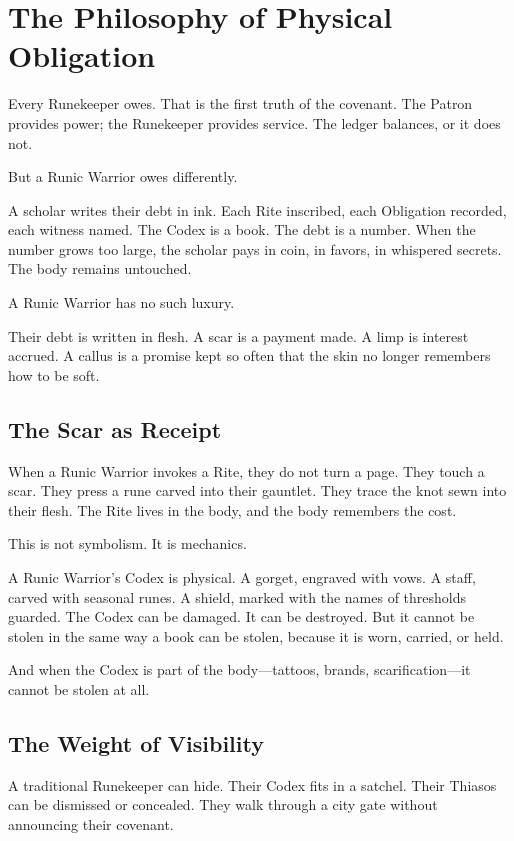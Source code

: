 \section{The Philosophy of Physical Obligation}

Every Runekeeper owes. That is the first truth of the covenant. The Patron provides power; the Runekeeper provides service. The ledger balances, or it does not.

But a Runic Warrior owes differently.

A scholar writes their debt in ink. Each Rite inscribed, each Obligation recorded, each witness named. The Codex is a book. The debt is a number. When the number grows too large, the scholar pays in coin, in favors, in whispered secrets. The body remains untouched.

A Runic Warrior has no such luxury.

Their debt is written in flesh. A scar is a payment made. A limp is interest accrued. A callus is a promise kept so often that the skin no longer remembers how to be soft.

\subsection{The Scar as Receipt}

When a Runic Warrior invokes a Rite, they do not turn a page. They touch a scar. They press a rune carved into their gauntlet. They trace the knot sewn into their flesh. The Rite lives in the body, and the body remembers the cost.

This is not symbolism. It is mechanics.

A Runic Warrior's Codex is physical. A gorget, engraved with vows. A staff, carved with seasonal runes. A shield, marked with the names of thresholds guarded. The Codex can be damaged. It can be destroyed. But it cannot be stolen in the same way a book can be stolen, because it is worn, carried, or held.

And when the Codex is part of the body—tattoos, brands, scarification—it cannot be stolen at all.

\subsection{The Weight of Visibility}

A traditional Runekeeper can hide. Their Codex fits in a satchel. Their Thiasos can be dismissed or concealed. They walk through a city gate without announcing their covenant.

